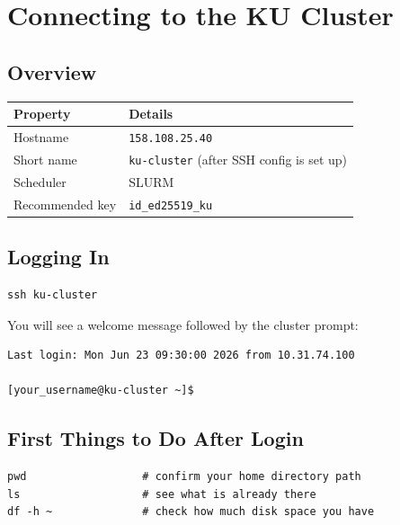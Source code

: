 \documentclass[12pt,a4paper]{article}
\begin{document}
\section{Connecting to the KU Cluster}

\subsection{Overview}

\begin{center}
\begin{tabular}{ll}
\toprule
\textbf{Property} & \textbf{Details} \\
\midrule
Hostname    & \texttt{158.108.25.40} \\
Short name  & \texttt{ku-cluster} (after SSH config is set up) \\
Scheduler   & SLURM \\
Recommended key & \texttt{id\_ed25519\_ku} \\
\bottomrule
\end{tabular}
\end{center}

\subsection{Logging In}

\begin{lstlisting}[style=bash]
ssh ku-cluster
\end{lstlisting}

You will see a welcome message followed by the cluster prompt:

\begin{lstlisting}[style=terminal]
Last login: Mon Jun 23 09:30:00 2026 from 10.31.74.100

[your_username@ku-cluster ~]$
\end{lstlisting}

\subsection{First Things to Do After Login}

\begin{lstlisting}[style=bash]
pwd                  # confirm your home directory path
ls                   # see what is already there
df -h ~              # check how much disk space you have
\end{lstlisting}
\end{document}
